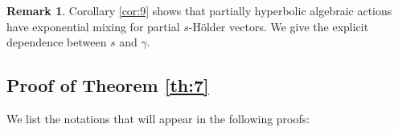 \documentclass[11 pt]{amsart}
\theoremstyle{definition}
\newtheorem{remark}[theorem]{Remark}
\numberwithin{equation}{section}
\begin{document}
\begin{remark}
Corollary \ref{cor:9} shows that partially hyperbolic algebraic actions have exponential mixing for partial $s$-H\"{o}lder vectors. We give the explicit dependence between $s$ and $\gamma$.
\end{remark}













\subsection{Proof of Theorem \ref{th:7}}\label{sec:21}We list  the notations that will appear in the following proofs:
\end{document}
